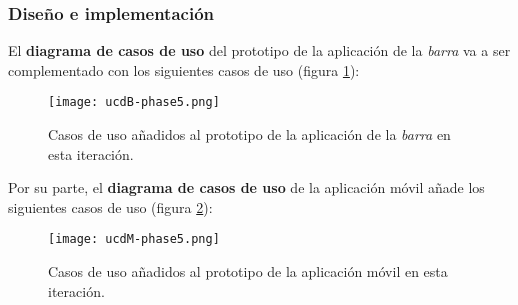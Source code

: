 \subsubsection{Diseño e implementación}
El \textbf{diagrama de casos de uso} del prototipo de la aplicación de la
\emph{barra} va a ser complementado con los siguientes casos de uso (figura
\ref{fig:ucdB-phase5}):

  \begin{figure}[H]
    \begin{center}
      \texttt{[image: ucdB-phase5.png]}
      \caption{Casos de uso añadidos al prototipo de la aplicación
      de la \emph{barra} en esta iteración.}
      \label{fig:ucdB-phase5}
    \end{center}
  \end{figure}

Por su parte, el \textbf{diagrama de casos de uso} de la aplicación móvil
añade los siguientes casos de uso (figura \ref{fig:ucdM-phase5}):

  \begin{figure}[H]
    \begin{center}
      \texttt{[image: ucdM-phase5.png]}
      \caption{Casos de uso añadidos al prototipo de la aplicación
      móvil en esta iteración.}
      \label{fig:ucdM-phase5}
    \end{center}
  \end{figure}

